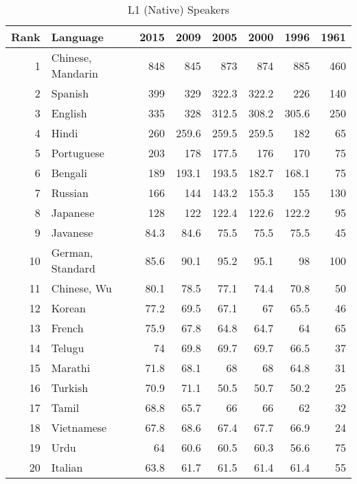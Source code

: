 \begin{appendices}
\begin{table}[H]
	\centering
	\caption{L1 (Native) Speakers}
	\begin{tabular}{rp{5cm}rrrrrr}
		\toprule
		\multicolumn{1}{l}{Rank} & Language & 2015  & 2009  & 2005  & 2000  & 1996  & 1961 \\
		\midrule
		1     & Chinese, Mandarin  & 848   & 845   & 873   & 874   & 885   & 460 \\
		2     & Spanish  & 399   & 329   & 322.3 & 322.2 & 226   & 140 \\
		3     & English  & 335   & 328   & 312.5 & 308.2 & 305.6 & 250 \\
		4     & Hindi  & 260   & 259.6 & 259.5 & 259.5 & 182   & 65 \\
		5     & Portuguese  & 203   & 178   & 177.5 & 176   & 170   & 75 \\
		6     & Bengali  & 189   & 193.1 & 193.5 & 182.7 & 168.1 & 75 \\
		7     & Russian  & 166   & 144   & 143.2 & 155.3 & 155   & 130 \\
		8     & Japanese  & 128   & 122   & 122.4 & 122.6 & 122.2 & 95 \\
		9     & Javanese  & 84.3  & 84.6  & 75.5  & 75.5  & 75.5  & 45 \\
		10    & German, Standard  & 85.6  & 90.1  & 95.2  & 95.1  & 98    & 100 \\
		11    & Chinese, Wu  & 80.1  & 78.5  & 77.1  & 74.4  & 70.8  & 50 \\
		12    & Korean  & 77.2  & 69.5  & 67.1  & 67    & 65.5  & 46 \\
		13    & French  & 75.9  & 67.8  & 64.8  & 64.7  & 64    & 65 \\
		14    & Telugu  & 74    & 69.8  & 69.7  & 69.7  & 66.5  & 37 \\
		15    & Marathi  & 71.8  & 68.1  & 68    & 68    & 64.8  & 31 \\
		16    & Turkish  & 70.9  & 71.1  & 50.5  & 50.7  & 50.2  & 25 \\
		17    & Tamil  & 68.8  & 65.7  & 66    & 66    & 62    & 32 \\
		18    & Vietnamese  & 67.8  & 68.6  & 67.4  & 67.7  & 66.9  & 24 \\
		19    & Urdu  & 64    & 60.6  & 60.5  & 60.3  & 56.6  & 75 \\
		20    & Italian  & 63.8  & 61.7  & 61.5  & 61.4  & 61.4  & 55 \\
				\bottomrule
	\end{tabular}%
	\label{tab:L1}%
\end{table}%


\end{appendices}
